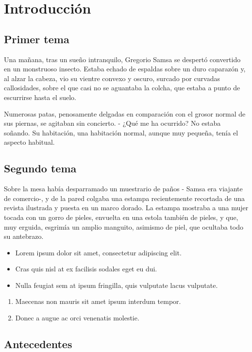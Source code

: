 \section{Introducción}
\subsection{Primer tema}
Una mañana, tras un sueño intranquilo, Gregorio Samsa se despertó convertido en un monstruoso insecto. Estaba echado de espaldas sobre un duro caparazón y, al alzar la cabeza, vio su vientre convexo y oscuro, surcado por curvadas callosidades, sobre el que casi no se aguantaba la colcha, que estaba a punto de escurrirse hasta el suelo.

Numerosas patas, penosamente delgadas en comparación con el grosor normal de sus piernas, se agitaban sin concierto. - ¿Qué me ha ocurrido? No estaba soñando. Su habitación, una habitación normal, aunque muy pequeña, tenía el aspecto habitual.

\subsection{Segundo tema}
Sobre la mesa había desparramado un muestrario de paños - Samsa era viajante de comercio-, y de la pared colgaba una estampa recientemente recortada de una revista ilustrada y puesta en un marco dorado. La estampa mostraba a una mujer tocada con un gorro de pieles, envuelta en una estola también de pieles, y que, muy erguida, esgrimía un amplio manguito, asimismo de piel, que ocultaba todo su antebrazo.

\begin{itemize}
	\item Lorem ipsum dolor sit amet, consectetur adipiscing elit.
	\item Cras quis nisl at ex facilisis sodales eget eu dui.
	\item Nulla feugiat sem at ipsum fringilla, quis vulputate lacus vulputate.
\end{itemize}
\begin{enumerate}
	\item Maecenas non mauris sit amet ipsum interdum tempor.
	\item Donec a augue ac orci venenatis molestie.
\end{enumerate}

\subsection{Antecedentes}

